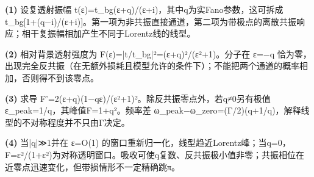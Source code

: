\par\noindent\textbf{(1)} 设复透射振幅 t(ε)=t\_bg(ε+q)/(ε+i)，其中q为实Fano参数，这可拆成 t\_bg[1+(q−i)/(ε+i)]。第一项为非共振直接通道，第二项为带极点的离散共振响应；相干复振幅相加产生不同于Lorentz线的线型。
\par\noindent\textbf{(2)} 相对背景透射强度为 F(ε)=|t/t\_bg|²=(ε+q)²/(ε²+1)。分子在 ε=−q 恰为零，出现完全反共振（在无额外损耗且模型允许的条件下）；不能把两个通道的概率相加，否则得不到该零点。
\par\noindent\textbf{(3)} 求导 F'=2(ε+q)(1−qε)/(ε²+1)²。除反共振零点外，若q≠0另有极值 ε\_peak=1/q，其峰值F=1+q²。频率差 ω\_peak−ω\_zero=(Γ/2)(q+1/q)，解释线型的不对称程度并不只由Γ决定。
\par\noindent\textbf{(4)} 当|q|≫1并在 ε=O(1) 的窗口重新归一化，线型趋近Lorentz峰；当q=0，F=ε²/(1+ε²)为对称透明窗口。吸收可使q复数、反共振极小值非零；共振相位在近零点迅速变化，但带损情形不一定精确跳π。
